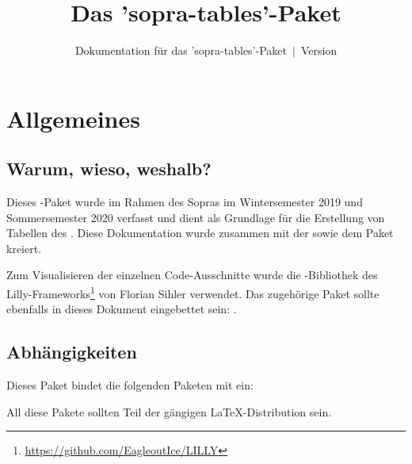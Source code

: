 \documentclass{sopra-base}
\title{Das 'sopra-tables'-Paket}
\subtitle[Dokumentation für das 'sopra-tables'-Paket]{Dokumentation für das 'sopra-tables'-Paket~$\mid$~Version \thesotversion}
\begin{document}
    \maketitle%
%
%

%
%
%
%

\section{Allgemeines}
\subsection{Warum, wieso, weshalb?}
    Dieses \LaTeXe-Paket wurde im Rahmen des Sopras im 
    Wintersemester 2019 und Sommersemester 2020 verfasst und dient als
    Grundlage für die Erstellung von Tabellen
    des . Diese Dokumentation wurde zusammen mit der 
     sowie dem Paket  kreiert.\par
    Zum Visualisieren der einzelnen Code-Ausschnitte wurde die 
    -Bibliothek des Lilly-Frameworks\footnote{\url{https://github.com/EagleoutIce/LILLY}} von
    Florian Sihler verwendet.
    Das zugehörige Paket sollte ebenfalls in dieses Dokument eingebettet sein: .
\subsection{Abhängigkeiten}
    Dieses Paket bindet die folgenden Paketen mit ein:
    \begin{multicols}{3}
    \end{multicols}
    All diese Pakete sollten Teil der gängigen \LaTeX-Distribution sein.
\end{document}

